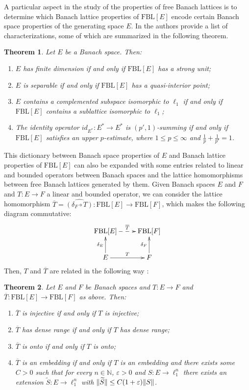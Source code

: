 \documentclass[12pt,leqno]{amsart}
\numberwithin{equation}{section} %
\newtheorem{thm}{Theorem}[section]
\theoremstyle{definition}
\numberwithin{equation}{section}
\newcommand{\eps}{\varepsilon}
\newcommand{\N}{\mathbb{N}}
\newcommand{\fbl}{\mathrm{FBL}}
\begin{document}
A particular aspect in the study of the properties of free Banach lattices is to determine which Banach lattice properties of $\fbl[E]$ encode certain Banach space properties of the generating space $E$. In \cite[Section 9]{OTTT} the authors provide a list of characterizations, some of which are summarized in the following theorem.

\begin{thm}\label{theo: equivalences BS BL}
    Let $E$ be a Banach space. Then:
    \begin{enumerate}
        \item $E$ has finite dimension if and only if $\fbl[E]$ has a strong unit;
        \item $E$ is separable if and only if $\fbl[E]$ has a quasi-interior point;
        \item $E$ contains a complemented subspace isomorphic to $\ell_1$ if and only if $\fbl[E]$ contains a sublattice isomorphic to $\ell_1$;
        \item The identity operator $id_{E^*}:E^*\rightarrow E^*$ is $(p',1)$-summing if and only if $\fbl[E]$ satisfies an upper $p$-estimate, where $1\leq p\leq \infty$ and $\frac{1}{p}+\frac{1}{p'}=1$.
    \end{enumerate}
\end{thm}

 This dictionary between Banach space properties of $E$ and Banach lattice properties of $\fbl[E]$ can also be expanded with some entries related to linear and bounded operators between Banach spaces and the lattice homomorphisms between free Banach lattices generated by them. Given Banach spaces $E$ and $F$ and $T:E\rightarrow F$ a linear and bounded operator, we can consider the lattice homomorphism $\overline{T}=\widehat{(\delta_F\circ T)}: \fbl[E]\rightarrow \fbl[F]$, which makes the following diagram commutative:
$$
\xymatrix{\fbl[E]\ar@{-->}[r]^{\overline{T}}& \fbl[F]\\
     E\ar[r]^{T}\ar^{\delta_E}[u]& F \ar^{\delta_F}[u]}
$$
Then, $T$ and $\overline{T}$ are related in the following way \cite[Section 3.1]{OTTT}:

\begin{thm}\label{theo: properties of Tbar}
    Let $E$ and $F$ be Banach spaces and $T:E\rightarrow F$ and $\overline{T}: \fbl[E]\rightarrow \fbl[F]$ as above. Then:
    \begin{enumerate}
        \item $\overline{T}$ is injective if and only if $T$ is injective;
        \item $\overline{T}$ has dense range if and only if $T$ has dense range;
        \item $\overline{T}$ is onto if and only if $T$ is onto;
        \item $\overline{T}$ is an embedding if and only if $T$ is an embedding and there exists some $C>0$ such that for every $n\in\N$, $\eps>0$ and $S:E\rightarrow \ell_1^n$ there exists an extension $\widetilde{S}:E\rightarrow \ell_1^n$ with $\norm[0]{\widetilde{S}}\leq C(1+\eps)\norm{S}$.
    \end{enumerate}
\end{thm}
\end{document}
